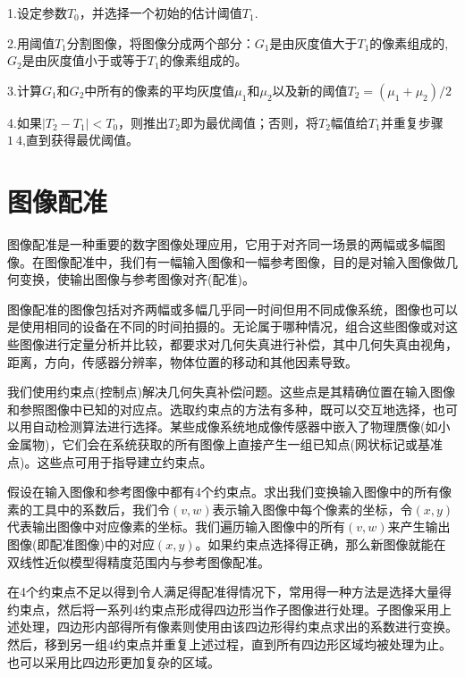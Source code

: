 \documentclass[11pt]{article}
\begin{document}
1.设定参数$T_0$，并选择一个初始的估计阈值$T_1$.

2.用阈值$T_1$分割图像，将图像分成两个部分：$G_1$是由灰度值大于$T_1$的像素组成的,$G_2$是由灰度值小于或等于$T_1$的像素组成的。

3.计算$G_1$和$G_2$中所有的像素的平均灰度值$\mu_1$和$\mu_2$以及新的阈值$T_2  = (\mu_1 + \mu_2)/2$

4.如果$|T_2 - T_1|<T_0$，则推出$T_2$即为最优阈值；否则，将$T_2$幅值给$T_1$并重复步骤$1~4$,直到获得最优阈值。

\section{图像配准}
图像配准是一种重要的数字图像处理应用，它用于对齐同一场景的两幅或多幅图像。在图像配准中，我们有一幅输入图像和一幅参考图像，目的是对输入图像做几何变换，使输出图像与参考图像对齐(配准)。

图像配准的图像包括对齐两幅或多幅几乎同一时间但用不同成像系统，图像也可以是使用相同的设备在不同的时间拍摄的。无论属于哪种情况，组合这些图像或对这些图像进行定量分析并比较，都要求对几何失真进行补偿，其中几何失真由视角，距离，方向，传感器分辨率，物体位置的移动和其他因素导致。

我们使用约束点(控制点)解决几何失真补偿问题。这些点是其精确位置在输入图像和参照图像中已知的对应点。选取约束点的方法有多种，既可以交互地选择，也可以用自动检测算法进行选择。某些成像系统地成像传感器中嵌入了物理赝像(如小金属物)，它们会在系统获取的所有图像上直接产生一组已知点(网状标记或基准点)。这些点可用于指导建立约束点。

假设在输入图像和参考图像中都有4个约束点。求出我们变换输入图像中的所有像素的工具中的系数后，我们令$(v,w)$表示输入图像中每个像素的坐标，令$(x,y)$代表输出图像中对应像素的坐标。我们遍历输入图像中的所有$(v,w)$来产生输出图像(即配准图像)中的对应$(x,y)$。如果约束点选择得正确，那么新图像就能在双线性近似模型得精度范围内与参考图像配准。

在4个约束点不足以得到令人满足得配准得情况下，常用得一种方法是选择大量得约束点，然后将一系列4约束点形成得四边形当作子图像进行处理。子图像采用上述处理，四边形内部得所有像素则使用由该四边形得约束点求出的系数进行变换。然后，移到另一组4约束点并重复上述过程，直到所有四边形区域均被处理为止。也可以采用比四边形更加复杂的区域。
\end{document}
